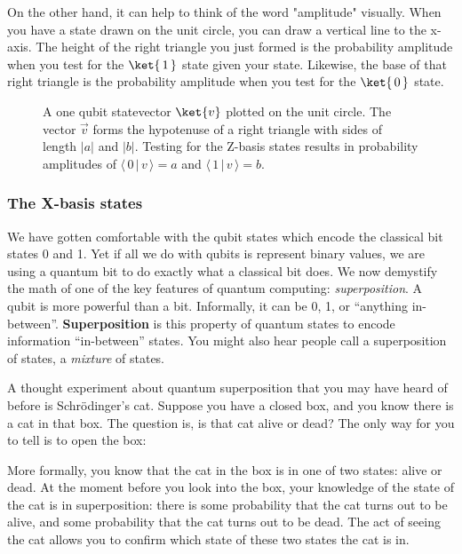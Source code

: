 \documentclass{article}
\theoremstyle{definition}
\newcommand{\abs}[1]{{\big\vert} #1 {\big\vert}}
\newcommand{\kz}[1]{\ket{\,#1\,}}
\newcommand{\kx}[1]{\ket{#1}}
\begin{document}
On the other hand, it can help to think of the word "amplitude" visually.  When you have a state drawn on the unit circle, you can draw a vertical line to the x-axis.  The height of the right triangle you just formed is the probability amplitude when you test for the $\kz1$ state given your state.  Likewise, the base of that right triangle is the probability amplitude when you test for the $\kz0$ state.
\begin{figure}[H]
	\caption{A one qubit statevector $\kx{v}$ plotted on the unit circle.  The vector $\vec{v}$ forms the hypotenuse of a right triangle with sides of length $\abs{a}$ and $\abs{b}$.  Testing for the Z-basis states results in probability amplitudes of $\langle \,0\,|\,v\,\rangle = a$ and $\langle \,1\,|\,v\,\rangle = b$.}
	\label{fig:unitcircletrinoangle}
\end{figure}

\subsubsection{The X-basis states}
We have gotten comfortable with the qubit states which encode the classical bit states 0 and 1.  Yet if all we do with qubits is represent binary values, we are using a quantum bit to do exactly what a classical bit does.  We now demystify the math of one of the key features of quantum computing: \textit{superposition}.
A qubit is more powerful than a bit.  Informally, it can be 0, 1, or ``anything in-between''.  \textbf{Superposition} is this property of quantum states to encode information ``in-between'' states.  You might also hear people call a superposition of states, a \textit{mixture} of states.

A thought experiment about quantum superposition that you may have heard of before is Schr\"odinger's cat.  Suppose you have a closed box, and you know there is a cat in that box.  The question is, is that cat alive or dead?  The only way for you to tell is to open the box:
\noindent%
\begin{minipage}[t]{0.45\linewidth}
	\begin{frame}{}
	\end{frame}
\end{minipage}
More formally, you know that the cat in the box is in one of two states: alive or dead.
At the moment before you look into the box, your knowledge of the state of the cat is in superposition: there is some probability that the cat turns out to be alive, and some probability that the cat turns out to be dead.
The act of seeing the cat allows you to confirm which state of these two states the cat is in.
\end{document}
